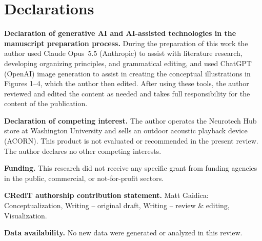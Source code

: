 \section*{Declarations}

\noindent\textbf{Declaration of generative AI and AI-assisted technologies in the manuscript preparation process.} During the preparation of this work the author used Claude Opus~5.5 (Anthropic) to assist with literature research, developing organizing principles, and grammatical editing, and used ChatGPT (OpenAI) image generation to assist in creating the conceptual illustrations in Figures 1--4, which the author then edited. After using these tools, the author reviewed and edited the content as needed and takes full responsibility for the content of the publication.

\noindent\textbf{Declaration of competing interest.} The author operates the Neurotech Hub store at Washington University and sells an outdoor acoustic playback device (ACORN). This product is not evaluated or recommended in the present review. The author declares no other competing interests.

\noindent\textbf{Funding.} This research did not receive any specific grant from funding agencies in the public, commercial, or not-for-profit sectors.

\noindent\textbf{CRediT authorship contribution statement.} Matt Gaidica: Conceptualization, Writing -- original draft, Writing -- review \& editing, Visualization.

\noindent\textbf{Data availability.} No new data were generated or analyzed in this review.
